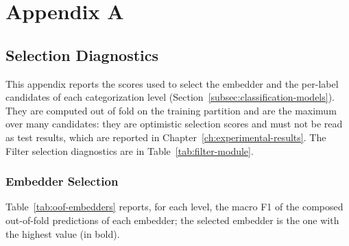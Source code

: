 \documentclass{Configuration_Files/PoliMi3i_thesis}
\begin{document}
\mainmatter %












\cleardoublepage
{} %
\appendix


\chapter{Appendix A}\label{ch:appendix-a}
\section{Selection Diagnostics}\label{sec:selection-diagnostics}
This appendix reports the scores used to select the embedder and the per-label candidates of each categorization level (Section~\ref{subsec:classification-models}). They are computed out of fold on the training partition and are the maximum over many candidates: they are optimistic selection scores and must not be read as test results, which are reported in Chapter~\ref{ch:experimental-results}. The Filter selection diagnostics are in Table~\ref{tab:filter-module}.

\subsection{Embedder Selection}
Table~\ref{tab:oof-embedders} reports, for each level, the macro F1 of the composed out-of-fold predictions of each embedder; the selected embedder is the one with the highest value (in bold).
\end{document}
